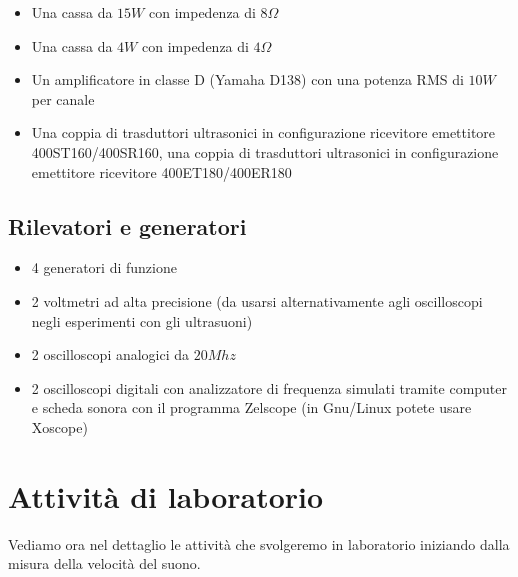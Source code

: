 \documentclass[a4paper,10pt,oneside]{article}
\begin{document}
\begin{itemize}
 \item Una cassa da $15W$ con impedenza di $8\Omega$
 \item Una cassa da $4W$ con impedenza di $4\Omega$
 \item Un amplificatore in classe D (Yamaha D138) con una potenza RMS di $10W$ per canale
 \item Una coppia di trasduttori ultrasonici in configurazione ricevitore emettitore 400ST160/400SR160, una coppia di trasduttori ultrasonici  in configurazione emettitore ricevitore 400ET180/400ER180
\end{itemize}



\subsection*{Rilevatori e generatori}
\begin{itemize}
 \item 4 generatori di funzione
 \item 2 voltmetri ad alta precisione (da usarsi alternativamente agli oscilloscopi negli esperimenti con gli ultrasuoni)
 \item 2 oscilloscopi analogici da $20Mhz$
 \item 2 oscilloscopi digitali con analizzatore di frequenza simulati tramite computer e scheda sonora con il programma Zelscope (in  Gnu/Linux potete usare Xoscope)
\end{itemize}

\section*{Attività di laboratorio}
Vediamo ora nel dettaglio le attività che svolgeremo in laboratorio iniziando dalla misura della velocità del suono.
\end{document}
